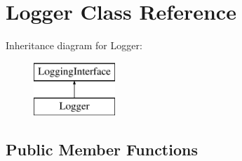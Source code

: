 \hypertarget{classLogger}{\section{Logger Class Reference}
\label{classLogger}
}
Inheritance diagram for Logger\-:\begin{figure}[H]
\begin{center}
\leavevmode
\includegraphics[height=2.000000cm]{classLogger}
\end{center}
\end{figure}
\subsection*{Public Member Functions}
